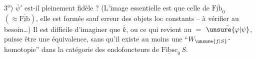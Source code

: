 3\textsuperscript{o}) $\bar\psi'$ est-il pleinement fidèle ?
(L'image essentielle est   que celle de $\overline{\underline{\mathrm{Fib}}_0}$  $(\approx\overline{\underline{\mathrm{Fib}}})$, elle est formée  sauf erreur des objets loc constants -- à vérifier au besoin\dots)
Il est difficile d'imaginer que $\bar k$, ou ce qui revient au $=$ $\bar{\unsure{\varphi|\psi}}$, puisse être une équivalence, sans qu'il existe au moins une ``$W_{\unsure{f|S}}$-homotopie''
dans la catégorie des endofoncteurs de $\underline{\mathrm{Fibsc}}_0\,S$. 

